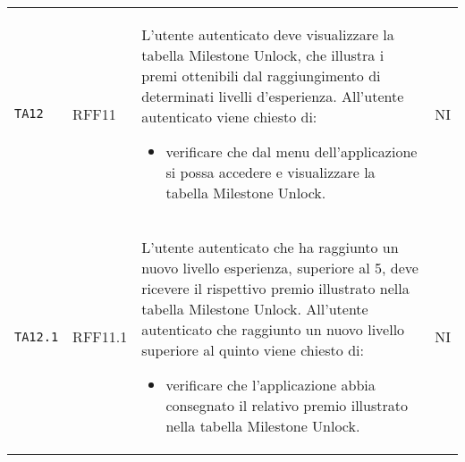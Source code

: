 \begin{longtable}{ >{\centering}p{} >{\centering}p{} >{\centering}p{}
			>{\centering}p{}}
		 \texttt{TA12}	& RFF11 &	L'utente autenticato deve visualizzare la tabella Milestone Unlock\glo, che illustra i premi ottenibili dal raggiungimento di determinati livelli d'esperienza. All'utente autenticato viene chiesto di:
		 \begin{itemize}
		 	\item verificare che dal menu dell'applicazione si possa accedere e visualizzare la tabella Milestone Unlock.
		 \end{itemize}	&	NI	\tabularnewline		 
		 \texttt{TA12.1}	& RFF11.1 &	L'utente autenticato che ha raggiunto un nuovo livello esperienza, superiore al 5, deve ricevere il rispettivo premio illustrato nella tabella Milestone Unlock\glo. All'utente autenticato che raggiunto un nuovo livello superiore al quinto viene chiesto di:
		 \begin{itemize}
		 	\item verificare che l'applicazione abbia consegnato il relativo premio illustrato nella tabella Milestone Unlock.
		 \end{itemize}	&	NI	\tabularnewline
		 

\end{longtable}
